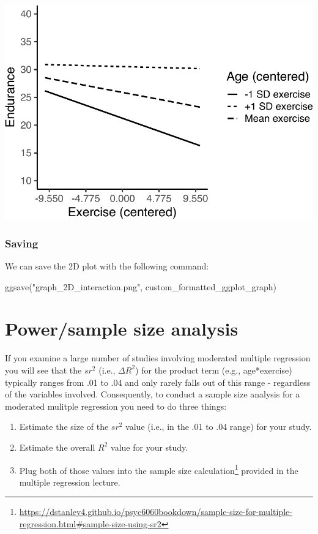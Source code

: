 \documentclass[
]{krantz}
\makeatletter
\newenvironment{Shaded}{\begin{snugshade}}{\end{snugshade}}
\newcommand{\FunctionTok}[1]{\textcolor[rgb]{0,0,0}{#1}}
\newcommand{\NormalTok}[1]{#1}
\newcommand{\StringTok}[1]{\textcolor[rgb]{0.5,0.5,0.5}{#1}}
\renewcommand{\href}[2]{#2\footnote{\url{#1}}}
\newenvironment{kframe}{%
\medskip{}
\setlength{\fboxsep}{.8em}
 \def\at@end@of@kframe{}%
 \ifinner\ifhmode%
  \def\at@end@of@kframe{\end{minipage}}%
  \begin{minipage}{\columnwidth}%
 \fi\fi%
 \def\FrameCommand##1{\hskip\@totalleftmargin \hskip-\fboxsep
 \colorbox{shadecolor}{##1}\hskip-\fboxsep
     \hskip-\linewidth \hskip-\@totalleftmargin \hskip\columnwidth}%
 \MakeFramed {\advance\hsize-\width
   \@totalleftmargin\z@ \linewidth\hsize
   \@setminipage}}%
 {\par\unskip\endMakeFramed%
 \at@end@of@kframe}
\renewenvironment{Shaded}{\begin{kframe}}{\end{kframe}}
\makeatother
\begin{document}
\includegraphics{bookdown_files/figure-latex/unnamed-chunk-491-1.pdf}

\hypertarget{saving-1}{%
\subsubsection{Saving}\label{saving-1}}

We can save the 2D plot with the following command:

\begin{Shaded}
\begin{Highlighting}[]
\FunctionTok{ggsave}\NormalTok{(}\StringTok{"graph\_2D\_interaction.png"}\NormalTok{, custom\_formatted\_ggplot\_graph)}
\end{Highlighting}
\end{Shaded}

\hypertarget{powersample-size-analysis}{%
\section{Power/sample size analysis}\label{powersample-size-analysis}}

If you examine a large number of studies involving moderated multiple regression you will see that the \(sr^2\) (i.e., \(\Delta R^2\)) for the product term (e.g., age*exercise) typically ranges from .01 to .04 and only rarely falls out of this range - regardless of the variables involved. Consequently, to conduct a sample size analysis for a moderated mulitple regression you need to do three things:

\begin{enumerate}
\def\labelenumi{\arabic{enumi}.}
\item
  Estimate the size of the \(sr^2\) value (i.e., in the .01 to .04 range) for your study.
\item
  Estimate the overall \(R^2\) value for your study.
\item
  Plug both of those values into the \href{https://dstanley4.github.io/psyc6060bookdown/sample-size-for-multiple-regression.html\#sample-size-using-sr2}{sample size calculation} provided in the multiple regression lecture.
\end{enumerate}
\end{document}
